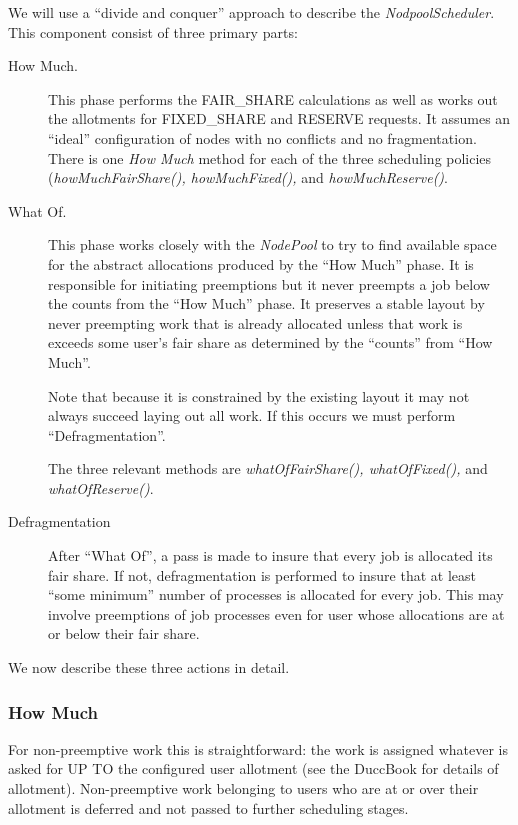    We will use a ``divide and conquer'' approach to describe the {\em NodpoolScheduler}.  This component consist of
    three primary parts:
    \begin{description}
      \item[How Much.]  This phase performs the FAIR\_SHARE calculations as well as works out the
        allotments for FIXED\_SHARE and RESERVE requests.  It assumes an ``ideal'' configuration of
        nodes with no conflicts and no fragmentation.  There is one {\em How Much} method for
        each of the three scheduling policies ({\em howMuchFairShare(), howMuchFixed(),} and
        {\em howMuchReserve()}.
          

      \item[What Of.] This phase works closely with the {\em NodePool} to try to find available
        space for the abstract allocations produced by the ``How Much'' phase.  It is responsible for initiating
        preemptions but it never preempts a job below the counts from the ``How Much'' phase.  It preserves
        a stable layout by never preempting work that is already allocated unless that work is exceeds
        some user's fair share as determined by the ``counts'' from ``How Much''.
        
        Note that because it is constrained by the existing layout it may not always succeed
        laying out all work.  If this occurs we must perform ``Defragmentation''.

        The three relevant methods are {\em whatOfFairShare(), whatOfFixed(),} and {\em whatOfReserve()}.

      \item[Defragmentation] After ``What Of'', a pass is made to insure that every job is allocated
        its fair share.  If not, defragmentation is performed to insure that at least ``some minimum'' 
        number of processes is allocated for every job.  This may involve preemptions
        of job processes even for user whose allocations are at or below their fair share.
    \end{description}


    We now describe these three actions in detail.

\subsubsection{How Much}

    For non-preemptive work this is straightforward: the work is assigned whatever is asked for UP TO
    the configured user allotment (see the DuccBook for details of allotment).  Non-preemptive work 
    belonging to users who are at or over their allotment is deferred and not passed to further scheduling stages.

